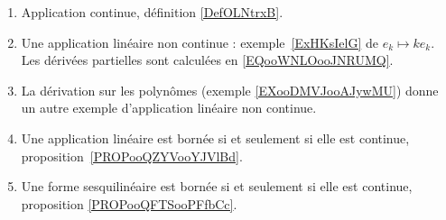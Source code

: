 
       \label{THEMEooYCBUooEnFdUg}
\begin{enumerate}
    \item
        Application continue, définition \ref{DefOLNtrxB}.
	\item
	      Une application linéaire non continue : exemple~\ref{ExHKsIelG} de \( e_k\mapsto ke_k\). Les dérivées partielles sont calculées en \eqref{EQooWNLOooJNRUMQ}.
	\item
	      La dérivation sur les polynômes (exemple \ref{EXooDMVJooAJywMU}) donne un autre exemple d'application linéaire non continue.
	\item
	      Une application linéaire est bornée si et seulement si elle est continue, proposition~\ref{PROPooQZYVooYJVlBd}.
      \item
          Une forme sesquilinéaire est bornée si et seulement si elle est continue, proposition \ref{PROPooQFTSooPFfbCc}.
\end{enumerate}
